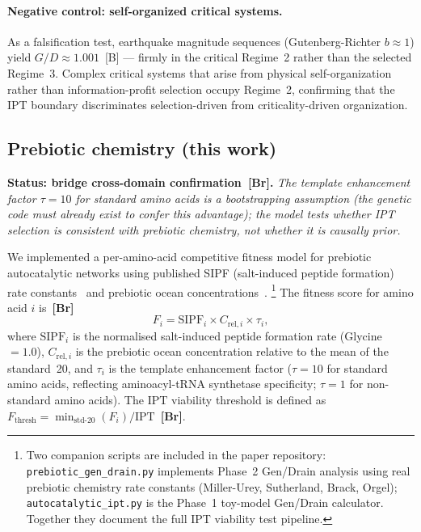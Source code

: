 \documentclass[11pt]{article}
\theoremstyle{remark}
\newcommand{\IPT}{\mathrm{IPT}}
\begin{document}
\paragraph{Negative control: self-organized critical systems.}
As a falsification test, earthquake magnitude sequences (Gutenberg-Richter $b \approx 1$) yield $G/D \approx 1.001$~[B] --- firmly in the critical Regime~2 rather than the selected Regime~3. Complex critical systems that arise from physical self-organization rather than information-profit selection occupy Regime~2, confirming that the IPT boundary discriminates selection-driven from criticality-driven organization.

\subsection{Prebiotic chemistry (this work)}
\label{sec:prebiotic}

\noindent\textbf{Status: bridge cross-domain confirmation~\textbf{[Br]}.}
\emph{The template enhancement factor $\tau=10$ for standard amino acids is a
bootstrapping assumption (the genetic code must already exist to confer this
advantage); the model tests whether IPT selection is \emph{consistent} with
prebiotic chemistry, not whether it is causally prior.}

\smallskip
We implemented a per-amino-acid competitive fitness model for prebiotic autocatalytic
networks using published SIPF (salt-induced peptide formation) rate constants~\cite{Rode1999}
and prebiotic ocean concentrations~\cite{SpivackGeneticCode}.%
\footnote{Two companion scripts are included in the paper repository:
\texttt{prebiotic\_gen\_drain.py} implements Phase~2 Gen/Drain analysis using real
prebiotic chemistry rate constants (Miller-Urey, Sutherland, Brack, Orgel);
\texttt{autocatalytic\_ipt.py} is the Phase~1 toy-model Gen/Drain calculator.
Together they document the full IPT viability test pipeline.}
The fitness score for amino acid $i$ is~\textbf{[Br]}
\begin{equation}
  F_i = \mathrm{SIPF}_i \times C_{\mathrm{rel},i} \times \tau_i,
\end{equation}
where $\mathrm{SIPF}_i$ is the normalised salt-induced peptide formation rate
(Glycine~$= 1.0$), $C_{\mathrm{rel},i}$ is the prebiotic ocean concentration
relative to the mean of the standard~20, and $\tau_i$ is the template enhancement
factor ($\tau = 10$ for standard amino acids, reflecting aminoacyl-tRNA synthetase
specificity; $\tau = 1$ for non-standard amino acids).
The $\IPT$ viability threshold is defined as
$F_\mathrm{thresh} = \min_{\mathrm{std\text{-}20}}(F_i) / \IPT$~\textbf{[Br]}.
\end{document}
